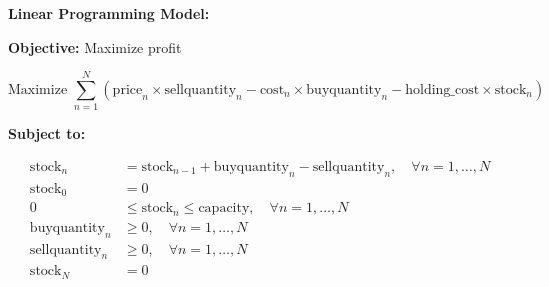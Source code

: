 \documentclass{article}
\begin{document}
\textbf{Linear Programming Model:}

\textbf{Objective:} Maximize profit

\begin{equation}
\text{Maximize } \sum_{n=1}^{N} \left( \text{price}_n \times \text{sellquantity}_n - \text{cost}_n \times \text{buyquantity}_n - \text{holding\_cost} \times \text{stock}_n \right)
\end{equation}

\textbf{Subject to:}

\begin{align}
\text{stock}_n &= \text{stock}_{n-1} + \text{buyquantity}_n - \text{sellquantity}_n, \quad \forall n = 1, \ldots, N \\
\text{stock}_0 &= 0 \\
0 &\leq \text{stock}_n \leq \text{capacity}, \quad \forall n = 1, \ldots, N \\
\text{buyquantity}_n &\geq 0, \quad \forall n = 1, \ldots, N \\
\text{sellquantity}_n &\geq 0, \quad \forall n = 1, \ldots, N \\
\text{stock}_N &= 0
\end{align}
\end{document}

